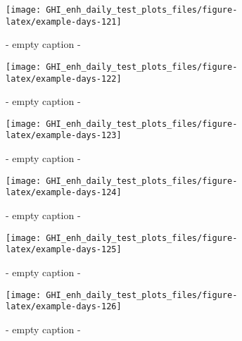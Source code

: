 \documentclass[
  10pt,
  a4paper,oneside]{article}
\begin{document}
\begin{figure}[H]

{\centering \texttt{[image: GHI\_enh\_daily\_test\_plots\_files/figure-latex/example-days-121]} 

}

\caption{ - empty caption - }\label{fig:example-days-121}
\end{figure}

\begin{figure}[H]

{\centering \texttt{[image: GHI\_enh\_daily\_test\_plots\_files/figure-latex/example-days-122]} 

}

\caption{ - empty caption - }\label{fig:example-days-122}
\end{figure}

\begin{figure}[H]

{\centering \texttt{[image: GHI\_enh\_daily\_test\_plots\_files/figure-latex/example-days-123]} 

}

\caption{ - empty caption - }\label{fig:example-days-123}
\end{figure}

\begin{figure}[H]

{\centering \texttt{[image: GHI\_enh\_daily\_test\_plots\_files/figure-latex/example-days-124]} 

}

\caption{ - empty caption - }\label{fig:example-days-124}
\end{figure}

\begin{figure}[H]

{\centering \texttt{[image: GHI\_enh\_daily\_test\_plots\_files/figure-latex/example-days-125]} 

}

\caption{ - empty caption - }\label{fig:example-days-125}
\end{figure}

\begin{figure}[H]

{\centering \texttt{[image: GHI\_enh\_daily\_test\_plots\_files/figure-latex/example-days-126]} 

}

\caption{ - empty caption - }\label{fig:example-days-126}
\end{figure}
\end{document}
